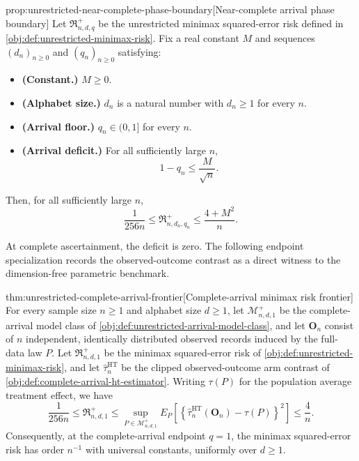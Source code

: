 \documentclass[11pt]{article}
\begin{document}
\begin{propositionv}{prop:unrestricted-near-complete-phase-boundary}[Near-complete arrival phase boundary]
Let \(\mathfrak R^{+}_{n,d,q}\) be the unrestricted minimax squared-error risk defined in \cref{obj:def:unrestricted-minimax-risk}. Fix a real constant \(M\) and sequences \((d_n)_{n\ge0}\) and \((q_n)_{n\ge0}\) satisfying:
\begin{itemize}
\item \textbf{(Constant.)} \(M\ge0\).
\item \textbf{(Alphabet size.)} \(d_n\) is a natural number with \(d_n\ge1\) for every \(n\).
\item \textbf{(Arrival floor.)} \(q_n\in(0,1]\) for every \(n\).
\item \textbf{(Arrival deficit.)} For all sufficiently large \(n\),
\[
1-q_n\le \frac{M}{\sqrt n}.
\]
\end{itemize}
Then, for all sufficiently large \(n\),
\[
\frac{1}{256n}
\le \mathfrak R^{+}_{n,d_n,q_n}
\le \frac{4+M^2}{n}.
\]
\end{propositionv}

At complete ascertainment, the deficit is zero. The following endpoint specialization records the observed-outcome contrast as a direct witness to the dimension-free parametric benchmark.

\begin{theoremv}{thm:unrestricted-complete-arrival-frontier}[Complete-arrival minimax risk frontier]
For every sample size \(n\ge 1\) and alphabet size \(d\ge 1\), let \(\mathcal M^{+}_{n,d,1}\) be the complete-arrival model class of \cref{obj:def:unrestricted-arrival-model-class}, and let \(\mathbf O_n\) consist of \(n\) independent, identically distributed observed records induced by the full-data law \(P\). Let \(\mathfrak R^{+}_{n,d,1}\) be the minimax squared-error risk of \cref{obj:def:unrestricted-minimax-risk}, and let \(\widehat\tau^{\mathrm{HT}}_n\) be the clipped observed-outcome arm contrast of \cref{obj:def:complete-arrival-ht-estimator}. Writing \(\tau(P)\) for the population average treatment effect, we have
\[
\frac{1}{256n}
\le \mathfrak R^{+}_{n,d,1}
\le
\sup_{P\in\mathcal M^{+}_{n,d,1}}
E_P\!\left[
\left\{\widehat\tau^{\mathrm{HT}}_n(\mathbf O_n)-\tau(P)\right\}^{2}
\right]
\le \frac{4}{n}.
\]
Consequently, at the complete-arrival endpoint \(q=1\), the minimax squared-error risk has order \(n^{-1}\) with universal constants, uniformly over \(d\ge 1\).
\end{theoremv}
\end{document}
